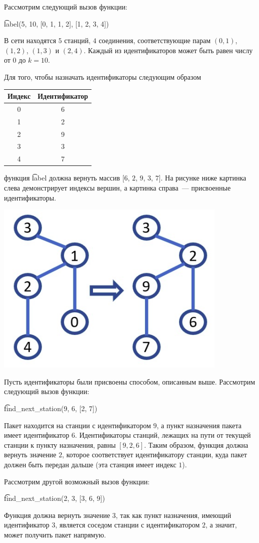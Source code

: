 Рассмотрим следующий вызов функции:

\t{label(5, 10, [0, 1, 1, 2], [1, 2, 3, 4])}

В сети находятся $5$ станций, $4$ соединения, соответствующие парам $(0, 1)$, $(1, 2)$, $(1, 3)$ и $(2, 4)$. Каждый из идентификаторов может быть равен числу от $0$ до $k=10$.

Для того, чтобы назначать идентификаторы следующим образом

\begin{center}
\renewcommand{\arraystretch}{1.5}
\begin{tabular}{|c|c|}
\hline
Индекс & Идентификатор  \\
\hline
0 & 6 \\
\hline
1 & 2 \\
\hline
2 & 9 \\
\hline
3 & 3\\
\hline
4 & 7\\
\hline

\end{tabular}
\end{center}

функция \t{label} должна вернуть массив [$6$, $2$, $9$, $3$, $7$]. На рисунке ниже картинка слева демонстрирует индексы вершин, а картинка справа~--- присвоенные идентификаторы.

\includegraphics{1.png}

Пусть идентификаторы были присвоены способом, описанным выше. Рассмотрим следующий вызов функции:

\t{find\_next\_station(9, 6, [2, 7])}


Пакет находится на станции с идентификатором $9$, а пункт назначения пакета имеет идентификатор $6$. Идентификаторы станций, лежащих на пути от текущей станции к пункту назначения, равны $[9, 2, 6]$. Таким образом, функция должна вернуть значение $2$, которое соответствует идентификатору станции, куда пакет должен быть передан дальше (эта станция имеет индекс $1$).

Рассмотрим другой возможный вызов функции:


\t{find\_next\_station(2, 3, [3, 6, 9])}

Функция должна вернуть значение $3$, так как пункт назначения, имеющий идентификатор $3$, является соседом станции с идентификатором $2$, а значит, может получить пакет напрямую.


